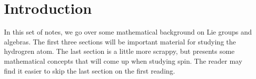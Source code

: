 \section{Introduction}
In this set of notes, we go over some mathematical background on Lie groups and algebras. The first three sections will be important material for studying the hydrogren atom. The last section is a little more scrappy, but presents some mathematical concepts that will come up when studying spin. The reader may find it easier to skip the last section on the first reading.
